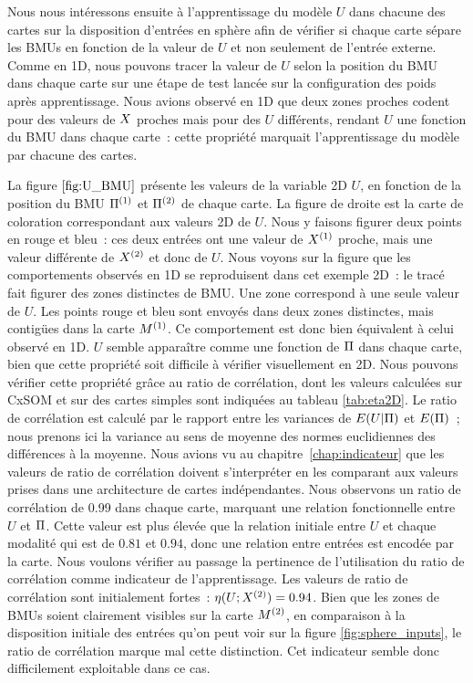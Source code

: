 \documentclass[../main]{subfiles}
\begin{document}
Nous nous intéressons ensuite à l'apprentissage du modèle $U$ dans chacune des cartes sur la disposition d'entrées en sphère afin de vérifier si chaque carte sépare les BMUs en fonction de la valeur de $U$ et non seulement de l'entrée externe.
Comme en 1D, nous pouvons tracer la valeur de $U$ selon la position du BMU dans chaque carte sur une étape de test lancée sur la configuration des poids après apprentissage.
Nous avions observé en 1D que deux zones proches codent pour des valeurs de $X$ proches mais pour des $U$ différents, rendant $U$ une fonction du BMU dans chaque carte~: cette propriété marquait l'apprentissage du modèle par chacune des cartes. 

La figure $\ref{fig:U_BMU}$ présente les valeurs de la variable 2D $U$, en fonction de la position du BMU $\Pi^{({1})}$ et $\Pi^{({2})}$ de chaque carte. La figure de droite est la carte de coloration correspondant aux valeurs 2D de $U$.
Nous y faisons figurer deux points en rouge et bleu~: ces deux entrées ont une valeur de $X^{({1})}$ proche, mais une valeur différente de $X^{({2})}$ et donc de $U$.
Nous voyons sur la figure que les comportements observés en 1D se reproduisent dans cet exemple 2D~: le tracé fait figurer des zones distinctes de BMU. Une zone correspond à une seule valeur de $U$.
Les points rouge et bleu sont envoyés dans deux zones distinctes, mais contigües dans la carte $M^{({1})}$. Ce comportement est donc bien équivalent à celui observé en 1D. $U$ semble apparaître comme une fonction de $\Pi$ dans chaque carte, bien que cette propriété soit difficile à vérifier visuellement en 2D.
Nous pouvons vérifier cette propriété grâce au ratio de corrélation, dont les valeurs calculées sur CxSOM et sur des cartes simples sont indiquées au tableau \ref{tab:eta2D}. Le ratio de corrélation est calculé par le rapport entre les variances de $E(U|\Pi)$ et $E(\Pi)$~; nous prenons ici la variance au sens de moyenne des normes euclidiennes des différences à la moyenne.
Nous avions vu au chapitre~\ref{chap:indicateur} que les valeurs de ratio de corrélation doivent s'interpréter en les comparant aux valeurs prises dans une architecture de cartes indépendantes. Nous observons un ratio de corrélation de 0.99 dans chaque carte, marquant une relation fonctionnelle entre $U$ et $\Pi$. Cette valeur est plus élevée que la relation initiale entre $U$ et chaque modalité qui est de $0.81$ et $0.94$, donc une relation entre entrées est encodée par la carte.
Nous voulons vérifier au passage la pertinence de l'utilisation du ratio de corrélation comme indicateur de l'apprentissage.
Les valeurs de ratio de corrélation sont initialement fortes~: $\eta(U;X^{({2})}) = 0.94$. Bien que les zones de BMUs soient clairement visibles sur la carte $M^{({2})}$, en comparaison à la disposition initiale des entrées qu'on peut voir sur la figure \ref{fig:sphere_inputs}, le ratio de corrélation marque mal cette distinction. Cet indicateur semble donc difficilement exploitable dans ce cas.
\end{document}
